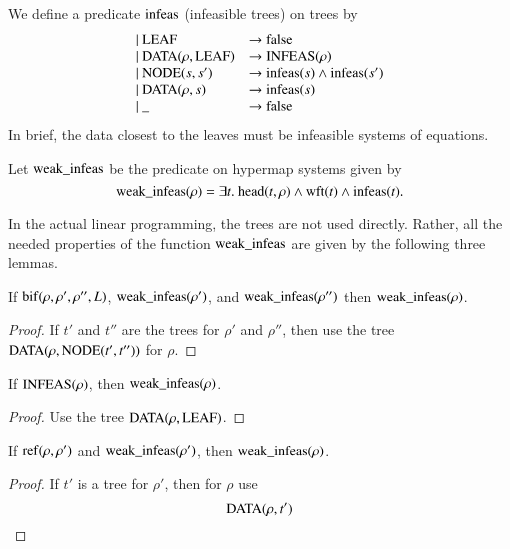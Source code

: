 We define a predicate ${\operatorname{infeas}}$ (infeasible trees) on trees by
    $$
    \begin{array}{lll}
    |\ {\operatorname{LEAF}} &\to {\operatorname{false}}\\
    |\ {\operatorname{DATA}}(\rho,{\operatorname{LEAF}}) &\to {\operatorname{INFEAS}}(\rho)\\
    |\ {\operatorname{NODE}}(s,s') &\to {\operatorname{infeas}}(s) \wedge {\operatorname{infeas}}(s')\\
    |\ {\operatorname{DATA}}(\rho,s) &\to {\operatorname{infeas}}(s)\\
    |\ {\operatorname{\_}} &\to {\operatorname{false}}\\
    \end{array}
    $$
In brief, the data closest to the leaves must be infeasible
systems of equations.

\begin{definition}
    Let ${\operatorname{weak\_infeas}}$ be the predicate on hypermap systems given by
        $$
        {\operatorname{weak\_infeas}}(\rho) = \exists t.\
        {\operatorname{head}}(t,\rho) \wedge {\operatorname{wft}}(t) \wedge
        {\operatorname{infeas}}(t).
        $$
\end{definition}

In the actual linear programming, the trees are not used directly.
Rather, all the needed properties of the function
${\operatorname{weak\_infeas}}$ are given by the following three lemmas.

\begin{lemma}
If ${\operatorname{bif}}(\rho,\rho',\rho'',L)$, ${\operatorname{weak\_infeas}}(\rho')$,
and
    ${\operatorname{weak\_infeas}}(\rho'')$ then ${\operatorname{weak\_infeas}}(\rho)$.
\end{lemma}

\begin{proof} If $t'$ and $t''$ are the trees for $\rho'$ and
$\rho''$, then use the tree ${\operatorname{DATA}}(\rho,{\operatorname{NODE}}(t',t''))$
for $\rho$.
\end{proof}

\begin{lemma}
If ${\operatorname{INFEAS}}(\rho)$, then ${\operatorname{weak\_infeas}}(\rho)$.
\end{lemma}

\begin{proof} Use the tree ${\operatorname{DATA}}(\rho,{\operatorname{LEAF}})$.
\end{proof}

\begin{lemma}
If ${\operatorname{ref}}(\rho,\rho')$ and ${\operatorname{weak\_infeas}}(\rho')$, then
  ${\operatorname{weak\_infeas}}(\rho)$.
\end{lemma}

\begin{proof} If $t'$ is a tree for $\rho'$, then for $\rho$ use
    $$
    {\operatorname{DATA}}(\rho,t')
    $$
\end{proof}


